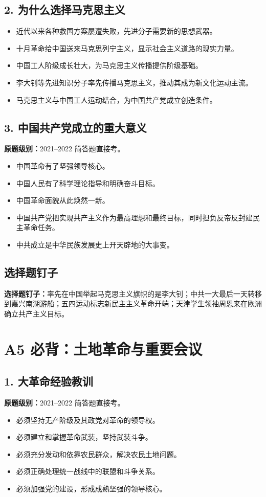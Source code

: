 \documentclass[UTF8,zihao=-4]{ctexart}
\newcommand{\exam}[1]{\textcolor{accent}{\bfseries 原题级别：}#1}
\newcommand{\pin}[1]{\textcolor{main}{\bfseries 选择题钉子：}#1}
\begin{document}
\subsection{2. 为什么选择马克思主义}
\begin{itemize}
  \item 近代以来各种救国方案屡遭失败，先进分子需要新的思想武器。
  \item 十月革命给中国送来马克思列宁主义，显示社会主义道路的现实力量。
  \item 中国工人阶级成长壮大，为马克思主义传播提供阶级基础。
  \item 李大钊等先进知识分子率先传播马克思主义，推动其成为新文化运动主流。
  \item 马克思主义与中国工人运动结合，为中国共产党成立创造条件。
\end{itemize}

\subsection{3. 中国共产党成立的重大意义}
\exam{2021--2022 简答题直接考。}
\begin{itemize}
  \item 中国革命有了坚强领导核心。
  \item 中国人民有了科学理论指导和明确奋斗目标。
  \item 中国革命面貌从此焕然一新。
  \item 中国共产党把实现共产主义作为最高理想和最终目标，同时担负反帝反封建民主革命任务。
  \item 中共成立是中华民族发展史上开天辟地的大事变。
\end{itemize}

\subsection{选择题钉子}
\pin{率先在中国举起马克思主义旗帜的是李大钊；中共一大最后一天转移到嘉兴南湖游船；五四运动标志新民主主义革命开端；天津学生领袖周恩来在欧洲确立共产主义目标。}

\newpage

\section{A5 必背：土地革命与重要会议}

\subsection{1. 大革命经验教训}
\exam{2021--2022 简答题直接考。}
\begin{itemize}
  \item 必须坚持无产阶级及其政党对革命的领导权。
  \item 必须建立和掌握革命武装，坚持武装斗争。
  \item 必须充分发动和依靠农民群众，解决农民土地问题。
  \item 必须正确处理统一战线中的联盟和斗争关系。
  \item 必须加强党的建设，形成成熟坚强的领导核心。
\end{itemize}
\end{document}
